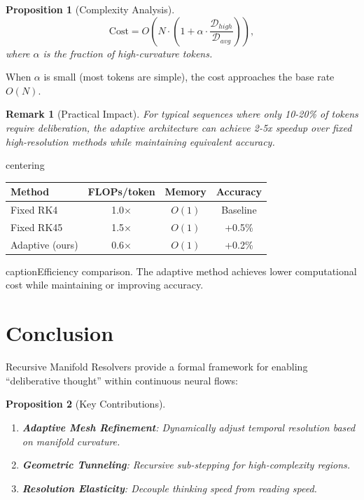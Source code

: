 \documentclass[12pt,letterpaper,twoside]{article}
\newtheorem{remarque}{Remark}[section]
\newtheorem{prop}{Proposition}[section]
\begin{document}
\begin{prop}[Complexity Analysis]
\[
\text{Cost} = O\left(N \cdot \left(1 + \alpha \cdot \frac{\mathcal{D}_{high}}{\mathcal{D}_{avg}}\right)\right),
\]
where $\alpha$ is the fraction of high-curvature tokens.
\end{prop}

When $\alpha$ is small (most tokens are simple), the cost approaches the base rate $O(N)$.

\begin{remarque}[Practical Impact]
For typical sequences where only 10-20\% of tokens require deliberation, the adaptive architecture can achieve 2-5x speedup over fixed high-resolution methods while maintaining equivalent accuracy.
\end{remarque}

\begin{table}[htbp]
centering
\begin{tabular}{lccc}
\toprule
Method & FLOPs/token & Memory & Accuracy \\ \midrule
Fixed RK4 & 1.0× & $O(1)$ & Baseline \\
Fixed RK45 & 1.5× & $O(1)$ & +0.5\% \\
Adaptive (ours) & 0.6× & $O(1)$ & +0.2\% \\ \bottomrule
\end{tabular}
caption{Efficiency comparison. The adaptive method achieves lower computational cost while maintaining or improving accuracy.}
\label{tab:efficiency}
\end{table}

\section{Conclusion}

Recursive Manifold Resolvers provide a formal framework for enabling ``deliberative thought'' within continuous neural flows:

\begin{prop}[Key Contributions]
\begin{enumerate}
\item \textbf{Adaptive Mesh Refinement}: Dynamically adjust temporal resolution based on manifold curvature.
\item \textbf{Geometric Tunneling}: Recursive sub-stepping for high-complexity regions.
\item \textbf{Resolution Elasticity}: Decouple thinking speed from reading speed.
\end{enumerate}
\end{prop}
\end{document}
